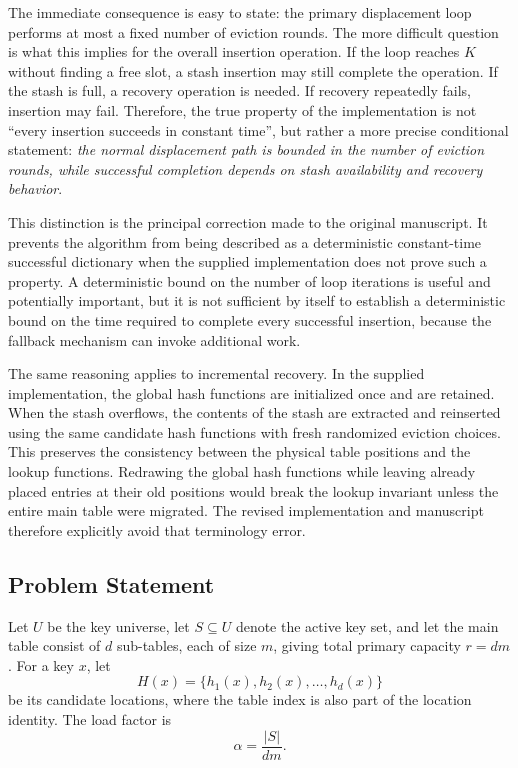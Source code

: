 \documentclass[conference]{IEEEtran}
\begin{document}
The immediate consequence is easy to state: the primary displacement loop performs at most a fixed number of eviction rounds. The more difficult question is what this implies for the overall insertion operation. If the loop reaches $K$ without finding a free slot, a stash insertion may still complete the operation. If the stash is full, a recovery operation is needed. If recovery repeatedly fails, insertion may fail. Therefore, the true property of the implementation is not ``every insertion succeeds in constant time'', but rather a more precise conditional statement: \emph{the normal displacement path is bounded in the number of eviction rounds, while successful completion depends on stash availability and recovery behavior}.

This distinction is the principal correction made to the original manuscript. It prevents the algorithm from being described as a deterministic constant-time successful dictionary when the supplied implementation does not prove such a property. A deterministic bound on the number of loop iterations is useful and potentially important, but it is not sufficient by itself to establish a deterministic bound on the time required to complete every successful insertion, because the fallback mechanism can invoke additional work.

The same reasoning applies to incremental recovery. In the supplied implementation, the global hash functions are initialized once and are retained. When the stash overflows, the contents of the stash are extracted and reinserted using the same candidate hash functions with fresh randomized eviction choices. This preserves the consistency between the physical table positions and the lookup functions. Redrawing the global hash functions while leaving already placed entries at their old positions would break the lookup invariant unless the entire main table were migrated. The revised implementation and manuscript therefore explicitly avoid that terminology error.

\subsection{Problem Statement}

Let $U$ be the key universe, let $S\subseteq U$ denote the active key set, and let the main table consist of $d$ sub-tables, each of size $m$, giving total primary capacity $r=dm$. For a key $x$, let
\begin{equation}
    H(x)=\{h_1(x),h_2(x),\ldots,h_d(x)\}
\end{equation}
be its candidate locations, where the table index is also part of the location identity. The load factor is
\begin{equation}
    \alpha = \frac{|S|}{dm}.
\end{equation}
\end{document}
